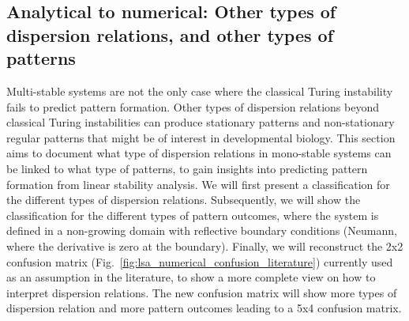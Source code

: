 \subsection{Analytical to numerical: Other types of dispersion relations, and other types of patterns} \label{nogrowth}
Multi-stable systems are not the only case where the classical Turing instability fails to predict pattern formation.
Other types of dispersion relations beyond classical Turing instabilities can produce stationary patterns and non-stationary regular patterns that might be of interest in developmental biology.
This section aims to document what type of dispersion relations in mono-stable systems can be linked to what type of patterns, to gain insights into predicting pattern formation from linear stability analysis.
We will first present a classification for the different types of dispersion relations.
Subsequently, we will show the classification for the different types of pattern outcomes, where the system is defined in a non-growing domain with reflective boundary conditions (Neumann, where the derivative is zero at the boundary).
Finally, we will reconstruct the 2x2 confusion matrix (Fig.~\ref{fig:lsa_numerical_confusion_literature}) currently used as an assumption in the literature, to show a more complete view on how to interpret dispersion relations.
The new confusion matrix will show more types of dispersion relation and more pattern outcomes leading to a 5x4 confusion matrix.

